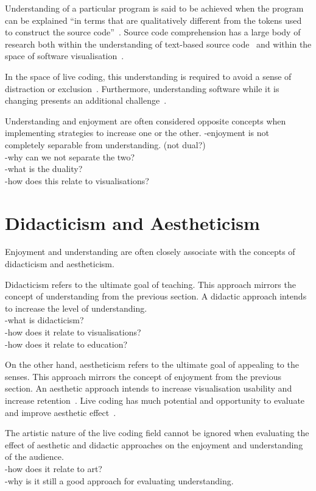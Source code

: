 Understanding of a particular program is said to be achieved when the program can be explained ``in terms that are qualitatively different from the tokens used to construct the source code''~\cite{Biggerstaff1994}. Source code comprehension has a large body of research both within the understanding of text-based source code~ and within the space of software visualisation~\cite{Hosking2005}.

In the space of live coding, this understanding is required to avoid a sense of distraction or exclusion~\cite{McLean2010a}. Furthermore, understanding software while it is changing presents an additional challenge~\cite{Eisenbarth2003}.

Understanding and enjoyment are often considered opposite concepts when implementing strategies to increase one or the other. 
-enjoyment is not completely separable from understanding. (not dual?)\\
-why can we not separate the two?\\
-what is the duality?\\
-how does this relate to visualisations?

\section{Didacticism and Aestheticism}

Enjoyment and understanding are often closely associate with the concepts of didacticism and aestheticism.

Didacticism refers to the ultimate goal of teaching. This approach mirrors the concept of understanding from the previous section. A didactic approach intends to increase the level of understanding.\\
-what is didacticism?\\
-how does it relate to visualisations?\\
-how does it relate to education?

On the other hand, aestheticism refers to the ultimate goal of appealing to the senses. This approach mirrors the concept of enjoyment from the previous section. An aesthetic approach intends to increase visualisation usability and increase retention~\cite{Cawthon2007}. Live coding has much potential and opportunity to evaluate and improve aesthetic effect~\cite{Bell}.

The artistic nature of the live coding field cannot be ignored when evaluating the effect of aesthetic and didactic approaches on the enjoyment and understanding of the audience.\\
-how does it relate to art?\\
-why is it still a good approach for evaluating understanding.

